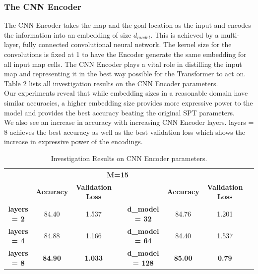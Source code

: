 \subsubsection{The CNN Encoder}
The CNN Encoder takes the map and the goal location as the input and encodes the information into an embedding of size $d_{model}$. This is achieved by a multi-layer, fully connected convolutional neural network. The kernel size for the convolutions is fixed at 1 to have the Encoder generate the same embedding for all input map cells. The CNN Encoder plays a vital role in distilling the input map and representing it in the best way possible for the Transformer to act on. Table 2 lists all investigation results on the CNN Encoder parameters.\\ 
Our experiments reveal that while embedding sizes in a reasonable domain have similar accuracies, a higher embedding size provides more expressive power to the model and provides the best accuracy beating the original SPT parameters.\\ 
We also see an increase in accuracy with increasing CNN Encoder layers. layers = 8 achieves the best accuracy as well as the best validation loss which shows the increase in expressive power of the encodings.
\begin{table}[]
\begin{center}
\begin{tabular}{@{}cccccccc@{}}

           &          & \multicolumn{3}{c}{\textbf{M=15}}            &                &                 &  \\ 
           & \textbf{Accuracy} & \textbf{Validation Loss} &  &                & \textbf{Accuracy}       & \textbf{Validation Loss} &  \\  
\textbf{layers = 2} & 84.40    & 1.537           &  & \textbf{d\_model = 32}  & 84.76          & 1.201           &  \\
\textbf{layers = 4} & 84.88    & 1.166           &  & \textbf{d\_model = 64}  & 84.40          & 1.537           &  \\
\textbf{layers = 8} & \textbf{84.90}    & \textbf{1.033}           &  & \textbf{d\_model = 128} & \textbf{85.00} & \textbf{0.79}   &  \\ 
\end{tabular}
\end{center}
\caption{Investigation Results on CNN Encoder parameters.}
\end{table}



